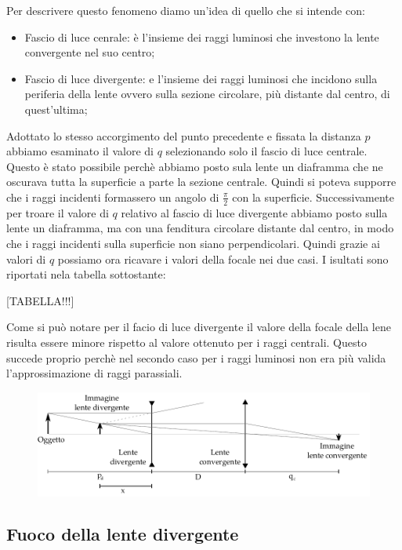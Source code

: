 Per descrivere questo fenomeno diamo un'idea di quello che si intende con:
\begin{itemize}
	\item{Fascio di luce cenrale: è l'insieme dei raggi luminosi che investono la lente convergente nel suo centro;}
	\item{Fascio di luce divergente: e l'insieme dei raggi luminosi che incidono sulla periferia della lente ovvero sulla sezione circolare, più distante dal centro, di quest'ultima;}
\end{itemize}
Adottato lo stesso accorgimento del punto precedente e fissata la distanza $p$ abbiamo esaminato il valore di $q$ selezionando solo il fascio di luce centrale. Questo è stato possibile perchè abbiamo posto sula lente un diaframma che ne oscurava tutta la superficie a parte la sezione centrale. Quindi si poteva supporre che i raggi incidenti formassero un angolo di $\frac{\pi}{2}$ con la superficie.
Successivamente per troare il valore di $q$ relativo al fascio di luce divergente abbiamo posto sulla lente un diaframma, ma con una fenditura circolare distante dal centro, in modo che i raggi incidenti sulla superficie non siano perpendicolari.
Quindi grazie ai valori di $q$ possiamo ora ricavare i valori della focale nei due casi. I isultati sono riportati nela tabella sottostante:

[TABELLA!!!]

Come si può notare per il facio di luce divergente il valore della focale della lene risulta essere minore rispetto al valore ottenuto per i raggi centrali. Questo succede proprio perchè nel secondo caso per i raggi luminosi non era più valida l'approssimazione di raggi parassiali.


\begin{figure}[b!]
	\includegraphics[width=16cm]{drawing2.pdf}
\end{figure}

\subsection{Fuoco della lente divergente}


